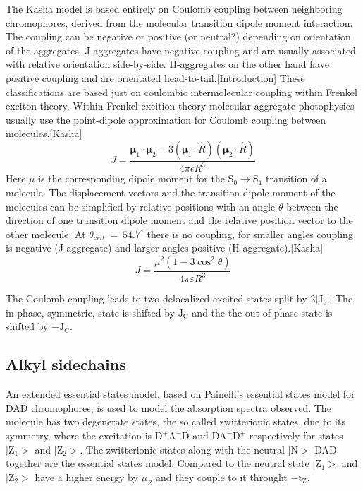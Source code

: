 \documentclass{article}
\begin{document}
\begin{multicols}{2}
The Kasha model is based entirely on Coulomb coupling between neighboring chromophores, derived from the molecular transition dipole moment interaction. The coupling can be negative or positive (or neutral?) depending on orientation of the aggregates. J-aggregates have negative coupling and are usually associated with relative orientation side-by-side. H-aggregates on the other hand have positive coupling and are orientated head-to-tail.[Introduction]\cite{doi:10.1021/acs.chemrev.7b00581}
These classifications are based just on coulombic intermolecular coupling within Frenkel exciton theory. Within Frenkel excition theory molecular aggregate photophysics usually use the point-dipole approximation for Coulomb coupling between molecules.\cite{doi:10.1021/acs.chemrev.7b00581}[Kasha]
\begin{equation}
J=\frac{\boldsymbol{\mu}_1 \cdot \boldsymbol{\mu}_2-3\left(\boldsymbol{\mu}_1 \cdot \hat{R}\right)\left(\boldsymbol{\mu}_2 \cdot \hat{R}\right)}{4 \pi \epsilon R^3}
\end{equation}
Here $\mu$ is the corresponding dipole moment for the $\mathrm{S_0 \rightarrow S_1}$ transition of a molecule. The displacement vectors and the transition dipole moment of the molecules can be simplified by relative positions with an angle $\theta$ between the direction of one transition dipole moment and the relative position vector to the other molecule. At $\theta_{crit} \: = \: 54.7^\circ$ there is no coupling, for smaller angles coupling is negative (J-aggregate) and larger angles positive (H-aggregate).\cite{doi:10.1021/acs.chemrev.7b00581}[Kasha]
\begin{equation}
J=\frac{\mu^2\left(1-3 \cos ^2 \theta\right)}{4 \pi \varepsilon R^3}
\end{equation}

The Coulomb coupling leads to two delocalized excited states split by 2$|\mathrm{J_c}|$. The in-phase, symmetric, state is shifted by $\mathrm{J_C}$ and the the out-of-phase state is shifted by $-\mathrm{J_C}$. 


\subsection{Alkyl sidechains}
An extended essential states model, based on Painelli's essential states model for DAD chromophores, is used to model the absorption spectra observed. The molecule has two degenerate states, the so called zwitterionic states, due to its symmetry, where the excitation is $\mathrm{D^+A^-D}$ and $\mathrm{DA^-D^+}$ respectively for states $\mathrm{|Z_1>}$ and $\mathrm{|Z_2>}$. The zwitterionic states along with the neutral $\mathrm{|N>}$ DAD together are the essential states model. Compared to the neutral state $\mathrm{|Z_1>}$ and $\mathrm{|Z_2>}$ have a higher energy by $\mu _Z$ and they couple to it throught $\mathrm{-t_Z}$.\cite{doi:10.1021/acs.jpcc.2c03665}





\end{multicols}
\end{document}
